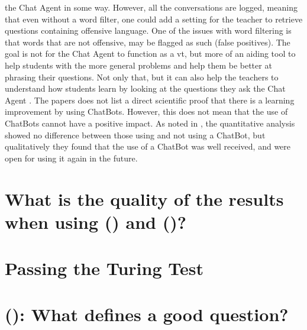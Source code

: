 the Chat Agent in some way. However, all the conversations are logged, meaning that even without a word filter, one could add a setting for the teacher to retrieve questions 
containing offensive language. One of the issues with word filtering is that words that are not offensive, may be flagged as such (false positives). 
\vspace{0.5em}\newline
The goal is not for the Chat Agent to function as a \gls{vt}, but more of an aiding tool to help students with the more general problems and help them be better at phrasing 
their questions. Not only that, but it can also help the teachers to understand how students learn by looking at the questions they ask the Chat Agent \cite{Knill2004,Rossi2011}. 
The papers does not list a direct scientific proof that there is a learning improvement by using ChatBots. However, this does not mean that the use of ChatBots cannot have a 
positive impact. As noted in \cite{Kowalski2013}, the quantitative analysis showed no difference between those using and not using a ChatBot, but qualitatively they found that 
the use of a ChatBot was well received, and were open for using it again in the future.


\section{What is the quality of the results when using  () and  ()?}
\label{chapter3:quality_results_hmm_bn}


\section{Passing the Turing Test}
\label{chapter3:turing_test}


\section{ (): What defines a good question?}
\label{chapter3:define_good_question}


